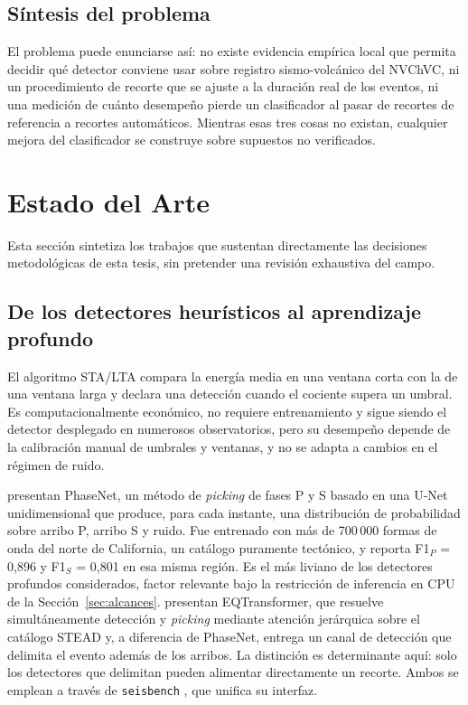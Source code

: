 \subsection{Síntesis del problema}
\label{subsec:sintesis-problema}

El problema puede enunciarse así: no existe evidencia empírica local que
permita decidir qué detector conviene usar sobre registro sismo-volcánico del
NVChVC, ni un procedimiento de recorte que se ajuste a la duración real de los
eventos, ni una medición de cuánto desempeño pierde un clasificador al pasar de
recortes de referencia a recortes automáticos. Mientras esas tres
cosas no existan, cualquier mejora del clasificador se construye sobre
supuestos no verificados.

\section{Estado del Arte}
\label{sec:estado-arte}

Esta sección sintetiza los trabajos que sustentan directamente las decisiones
metodológicas de esta tesis, sin pretender una revisión exhaustiva del campo.

\subsection{De los detectores heurísticos al aprendizaje profundo}

El algoritmo STA/LTA \parencite{allen1978stalta} compara la energía media en
una ventana corta con la de una ventana larga y declara una detección cuando
el cociente supera un umbral. Es computacionalmente económico, no requiere
entrenamiento y sigue siendo el detector desplegado en numerosos
observatorios, pero su desempeño depende de la calibración manual de umbrales
y ventanas, y no se adapta a cambios en el régimen de ruido.

\textcite{zhu2019phasenet} presentan PhaseNet, un método de \emph{picking} de
fases P y S basado en una U-Net unidimensional que produce, para cada instante,
una distribución de probabilidad sobre arribo P, arribo S y ruido. Fue entrenado
con más de 700\,000 formas de onda del norte de California, un catálogo
puramente tectónico, y reporta F1$_P$ = 0,896 y F1$_S$ = 0,801 en esa misma
región. Es el más liviano de los detectores profundos considerados, factor
relevante bajo la restricción de inferencia en CPU de la
Sección~\ref{sec:alcances}. \textcite{mousavi2020eqtransformer} presentan
EQTransformer, que resuelve simultáneamente detección y \emph{picking} mediante
atención jerárquica sobre el catálogo STEAD y, a diferencia de PhaseNet, entrega
un canal de detección que delimita el evento además de los arribos. La
distinción es determinante aquí: solo los detectores que delimitan pueden
alimentar directamente un recorte. Ambos se emplean a través de
\texttt{seisbench} \parencite{woollam2022seisbench}, que unifica su interfaz.

